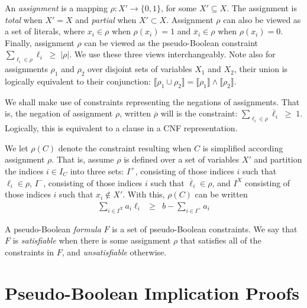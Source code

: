\documentclass{easychair}
\renewcommand{\obar}[1]{\overline{#1}}
\newcommand{\lit}{\ell}
\newcommand{\assign}{\rho}
\newcommand{\nassign}{\obar{\assign}}
\newcommand{\indices}{I}
\newcommand{\func}[1]{\llbracket#1\rrbracket}
\begin{document}
An {\em assignment} is a mapping $\assign : X' \rightarrow \{0,1\}$,
for some $X' \subseteq X$.  The assignment is {\em total} when $X' =
X$ and {\em partial} when $X' \subset X$.  Assignment $\assign$ can
also be viewed as a set of literals, where $x_i \in \assign$ when
$\assign(x_i) = 1$ and $\obar{x}_i \in \assign$ when $\assign(x_i) = 0$.
Finally, assignment $\assign$ can be viewed as the
pseudo-Boolean constraint $\sum_{\lit_i \in \assign} \lit_i \;\geq\;| \assign |$.
We use these three views interchangeably.  Note also for
assignments $\assign_1$ and $\assign_2$ over disjoint sets of
variables $X_1$ and $X_2$, their union is logically equivalent to
their conjunction: $\func{\assign_1 \cup \assign_2} = \func{\assign_1}
\land \func{\assign_2}$.

We shall make use of constraints representing the negations of
assignments.  That is, the negation of assignment $\assign$, written
$\nassign$ will is the constraint:
$\sum_{\lit_i \in \assign} \obar{\lit}_i \;\geq\; 1$.
Logically, this is equivalent to a clause in a CNF
representation.

We let $\assign(C)$ denote the constraint resulting when $C$ is
simplified according assignment $\assign$.  That is, assume $\assign$ is defined over a set of variables $X'$ and
partition the indices $i \in \indices_C$ into
three sets:
$I^{+}$, consisting of those indices $i$ such that $\lit_{i} \in \assign$,
$I^{-}$, consisting of those indices $i$ such that $\obar{\lit}_{i} \in \assign$,
and $I^{X}$ consisting of those indices $i$ such that $x_i \not \in X'$.
With this, $\assign(C)$ can be written
\begin{eqnarray}
\sum_{i \in I^{X}} a_{i} \lit_{i} & \geq & b - \sum_{i \in I^{+}} a_{i} \label{eqn:assigned}
\end{eqnarray}

A pseudo-Boolean {\em formula} $F$ is a set of pseudo-Boolean
constraints.  We say that $F$ is {\em satisfiable} when there is some
assignment $\assign$ that satisfies all of the constraints in $F$, and
{\em unsatisfiable} otherwise.  


\section{Pseudo-Boolean Implication Proofs}
\end{document}
